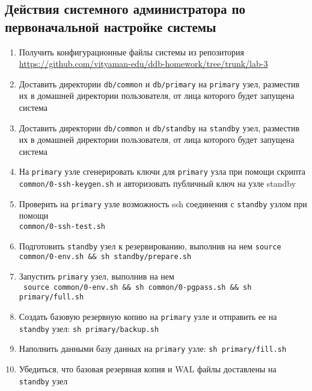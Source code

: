 \documentclass{article}
\begin{document}
\subsection{Действия системного администратора по первоначальной настройке системы}

\begin{enumerate}
    \item Получить конфигурационные файлы системы из репозитория \\
    \url{https://github.com/vityaman-edu/ddb-homework/tree/trunk/lab-3}

    \item Доставить директории \texttt{db/common} и \texttt{db/primary} на \texttt{primary} узел, разместив их в домашней директории пользователя, от лица которого будет запущена система
    
    \item Доставить директории \texttt{db/common} и \texttt{db/standby} на \texttt{standby} узел, разместив их в домашней директории пользователя, от лица которого будет запущена система
    
    \item На \texttt{primary} узле сгенерировать ключи для \texttt{primary} узла при помощи скрипта \\ \texttt{common/0-ssh-keygen.sh} и авторизовать публичный ключ на узле standby 
    
    \item Проверить на \texttt{primary} узле возможность ssh соединения с \texttt{standby} узлом при помощи \\ \texttt{common/0-ssh-test.sh}
    
    \item Подготовить \texttt{standby} узел к резервированию, выполнив на нем \texttt{source common/0-env.sh \&\& sh standby/prepare.sh}
    
    \item Запустить \texttt{primary} узел, выполнив на нем \\
    \texttt{
        source common/0-env.sh \&\& 
        sh common/0-pgpass.sh \&\& 
        sh primary/full.sh}

    \item Создать базовую резервную копию на \texttt{primary} узле и отправить ее на \texttt{standby} узел: \texttt{sh primary/backup.sh}
    
    \item Наполнить данными базу данных на \texttt{primary} узле:
    \texttt{sh primary/fill.sh}

    \item Убедиться, что базовая резервная копия и WAL файлы доставлены на \texttt{standby} узел

\end{enumerate}
\end{document}
